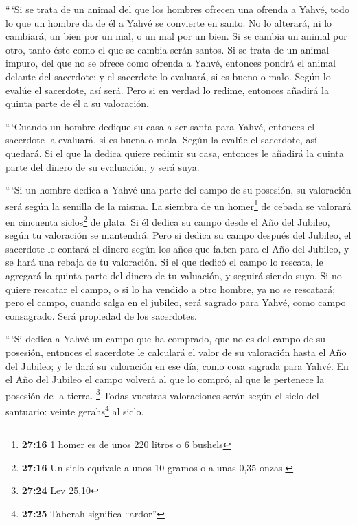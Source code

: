  ``\,`Si se trata de un animal del que los hombres ofrecen
una ofrenda a Yahvé, todo lo que un hombre da de él a Yahvé se convierte
en santo.  No lo alterará, ni lo cambiará, un bien por un
mal, o un mal por un bien. Si se cambia un animal por otro, tanto éste
como el que se cambia serán santos.  Si se trata de un
animal impuro, del que no se ofrece como ofrenda a Yahvé, entonces
pondrá el animal delante del sacerdote;  y el sacerdote
lo evaluará, si es bueno o malo. Según lo evalúe el sacerdote, así será.
 Pero si en verdad lo redime, entonces añadirá la quinta
parte de él a su valoración.

 ``\,`Cuando un hombre dedique su casa a ser santa para
Yahvé, entonces el sacerdote la evaluará, si es buena o mala. Según la
evalúe el sacerdote, así quedará.  Si el que la dedica
quiere redimir su casa, entonces le añadirá la quinta parte del dinero
de su evaluación, y será suya.

 ``\,`Si un hombre dedica a Yahvé una parte del campo de
su posesión, su valoración será según la semilla de la misma. La siembra
de un homer\footnote{\textbf{27:16} 1 homer es de unos 220 litros o 6
  bushels} de cebada se valorará en cincuenta siclos\footnote{\textbf{27:16}
  Un siclo equivale a unos 10 gramos o a unas 0,35 onzas.} de plata.
 Si él dedica su campo desde el Año del Jubileo, según tu
valoración se mantendrá.  Pero si dedica su campo después
del Jubileo, el sacerdote le contará el dinero según los años que falten
para el Año del Jubileo, y se hará una rebaja de tu valoración.
 Si el que dedicó el campo lo rescata, le agregará la
quinta parte del dinero de tu valuación, y seguirá siendo suyo.
 Si no quiere rescatar el campo, o si lo ha vendido a
otro hombre, ya no se rescatará;  pero el campo, cuando
salga en el jubileo, será sagrado para Yahvé, como campo consagrado.
Será propiedad de los sacerdotes.

 ``\,`Si dedica a Yahvé un campo que ha comprado, que no
es del campo de su posesión,  entonces el sacerdote le
calculará el valor de su valoración hasta el Año del Jubileo; y le dará
su valoración en ese día, como cosa sagrada para Yahvé. 
En el Año del Jubileo el campo volverá al que lo compró, al que le
pertenece la posesión de la tierra. \footnote{\textbf{27:24} Lev 25,10}
 Todas vuestras valoraciones serán según el siclo del
santuario: veinte gerahs\footnote{\textbf{27:25} Taberah significa
  ``ardor''} al siclo.


